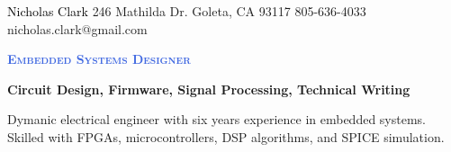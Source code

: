 \documentclass[letterpaper, 10pt]{article}
\newcommand{\NrcColorName}{Black}
\newcommand{\NrcColorTitle}{RoyalBlue}
\begin{document}
%
\nrctitle
{\textcolor{\NrcColorName}{Nicholas Clark}}
{246 Mathilda Dr.}
{Goleta, CA 93117}
{805-636-4033}
{nicholas.clark@gmail.com}
%
\begin{center}\par\smallskip
\textcolor{\NrcColorTitle}{\Large \textbf{\textsc{Embedded Systems Designer}}}\par
\large \textbf{{Circuit Design, Firmware, Signal Processing, Technical Writing}}\par
\smallskip
\noindent \begin{minipage}[t]{0.75\textwidth}%
\begin{sloppypar}
Dymanic electrical engineer with six years experience in embedded systems. 
Skilled with FPGAs, microcontrollers, DSP algorithms, and SPICE simulation.
\end{sloppypar}
\end{minipage}
\end{center}
\par \smallskip \smallskip
%
%
\end{document}
